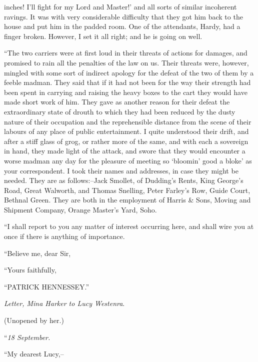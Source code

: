 \documentclass[12pt,openright]{book}
\begin{document}
inches! I’ll fight for my Lord and Master!’ and all sorts of similar incoherent ravings. It was with very considerable difficulty that they got him back to the house and put him in the padded room. One of the attendants, Hardy, had a finger broken. However, I set it all right; and he is going on well.

“The two carriers were at first loud in their threats of actions for damages, and promised to rain all the penalties of the law on us. Their threats were, however, mingled with some sort of indirect apology for the defeat of the two of them by a feeble madman. They said that if it had not been for the way their strength had been spent in carrying and raising the heavy boxes to the cart they would have made short work of him. They gave as another reason for their defeat the extraordinary state of drouth to which they had been reduced by the dusty nature of their occupation and the reprehensible distance from the scene of their labours of any place of public entertainment. I quite understood their drift, and after a stiff glass of grog, or rather more of the same, and with each a sovereign in hand, they made light of the attack, and swore that they would encounter a worse madman any day for the pleasure of meeting so ‘bloomin’ good a bloke’ as your correspondent. I took their names and addresses, in case they might be needed. They are as follows:–Jack Smollet, of Dudding’s Rents, King George’s Road, Great Walworth, and Thomas Snelling, Peter Farley’s Row, Guide Court, Bethnal Green. They are both in the employment of Harris \& Sons, Moving and Shipment Company, Orange Master’s Yard, Soho.

“I shall report to you any matter of interest occurring here, and shall wire you at once if there is anything of importance.

“Believe me, dear Sir,

“Yours faithfully,

“PATRICK HENNESSEY.”

\textit{Letter, Mina Harker to Lucy Westenra}.

(Unopened by her.)

“\textit{18 September.}

“My dearest Lucy,–
\end{document}
